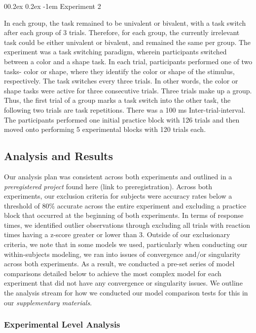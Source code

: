 \documentclass[
  english,
  man,floatsintext]{apa6}
\makeatletter
\let\oldparagraph\paragraph
\renewcommand{\paragraph}{
    \@ifstar
      \xxxParagraphStar
      \xxxParagraphNoStar
  }
\newcommand{\xxxParagraphStar}[1]{\oldparagraph*{#1}\mbox{}}
\newcommand{\xxxParagraphNoStar}[1]{\oldparagraph{#1}\mbox{}}
\renewcommand{\paragraph}{\@startsection{paragraph}{4}{\parindent}%
  {0\baselineskip \@plus 0.2ex \@minus 0.2ex}%
  {-1em}%
  {\normalfont\normalsize\bfseries\itshape\typesectitle}}
\makeatother
\begin{document}
\paragraph{Experiment 2}\label{experiment-2}

In each group, the task remained to be univalent or bivalent, with a task switch after each group of 3 trials. Therefore, for each group, the currently irrelevant task could be either univalent or bivalent, and remained the same per group. The experiment was a task switching paradigm, wherein participants switched between a color and a shape task. In each trial, participants performed one of two tasks- color or shape, where they identify the color or shape of the stimulus, respectively. The task switches every three trials. In other words, the color or shape tasks were active for three consecutive trials. Three trials make up a group. Thus, the first trial of a group marks a task switch into the other task, the following two trials are task repetitions. There was a 100 ms Inter-trial-interval. The participants performed one initial practice block with 126 trials and then moved onto performing 5 experimental blocks with 120 trials each.

\subsection{Analysis and Results}\label{analysis-and-results}

Our analysis plan was consistent across both experiments and outlined in a \emph{preregistered project} found here (link to preregistration). Across both experiments, our exclusion criteria for subjects were accuracy rates below a threshold of 80\% accurate across the entire experiment and excluding a practice block that occurred at the beginning of both experiments. In terms of response times, we identified outlier observations through excluding all trials with reaction times having a z-score greater or lower than 3. Outside of our exclusionary criteria, we note that in some models we used, particularly when conducting our within-subjects modeling, we ran into issues of convergence and/or singularity across both experiments. As a result, we conducted a pre-set series of model comparisons detailed below to achieve the most complex model for each experiment that did not have any convergence or singularity issues. We outline the analysis stream for how we conducted our model comparison tests for this in our \emph{supplementary materials}.

\subsubsection{Experimental Level Analysis}\label{experimental-level-analysis}
\end{document}
